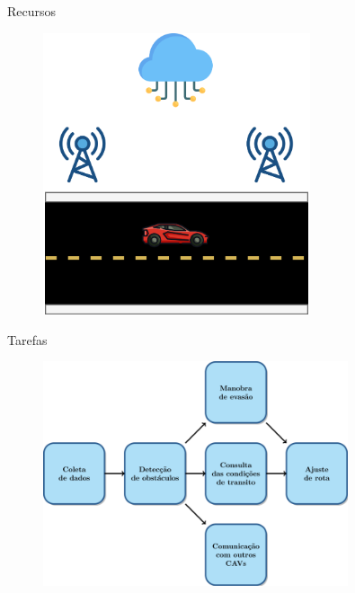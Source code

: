 \begin{frame}{Recursos}
    \begin{figure}
        \centering
        \includegraphics[width=0.7\textwidth]{Figuras/cav-scenario.png}
    \end{figure}
\end{frame}

\begin{frame}{Tarefas}
    \begin{figure}
        \centering
        \includegraphics[width=0.8\textwidth]{Figuras/cav-task.png}
    \end{figure}
\end{frame}

